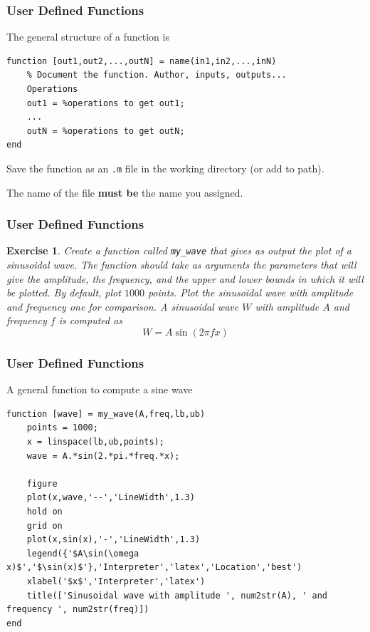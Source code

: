 \documentclass[11pt,xcolor={svgnames},aspectratio=169,usepdftitle=false]{beamer}
\let\toneitemize\itemize
\let\ttwoitemize\enditemize
\renewenvironment{itemize}{\toneitemize\addtolength{\itemsep}{1.35\baselineskip}}{\ttwoitemize}
\newtheorem{exercise}{Exercise}
\begin{document}
\begin{frame}[fragile]
    \frametitle{User Defined Functions}
\begin{itemize}
    \item The general structure of a function is
\begin{lstlisting}
function [out1,out2,...,outN] = name(in1,in2,...,inN)
    % Document the function. Author, inputs, outputs...
    Operations
    out1 = %operations to get out1;
    ...
    outN = %operations to get outN;
end
\end{lstlisting}
    \item Save the function as an \verb;.m; file in the working directory (or add to path).
    \item The name of the file \alert{\textbf{must be}} the name you assigned.
\end{itemize}
\end{frame}

\begin{frame}[fragile]
    \frametitle{User Defined Functions}
\begin{exercise}
Create a function called \verb;my_wave; that gives as output the plot of a sinusoidal wave. The function should take as arguments the parameters that will give the amplitude, the frequency, and the upper and lower bounds in which it will be plotted. By default, plot $1000$ points. Plot the sinusoidal wave with amplitude and frequency one for comparison. A sinusoidal wave $W$ with amplitude $A$ and frequency $f$ is computed as 
\[
W = A \sin(2\pi f x)
\]
\end{exercise}
\end{frame}

\begin{frame}[fragile]
    \frametitle{User Defined Functions}

A general function to compute a sine wave
\begin{lstlisting}
function [wave] = my_wave(A,freq,lb,ub)
    points = 1000;
    x = linspace(lb,ub,points);
    wave = A.*sin(2.*pi.*freq.*x);
    
    figure
    plot(x,wave,'--','LineWidth',1.3)
    hold on
    grid on
    plot(x,sin(x),'-','LineWidth',1.3)
    legend({'$A\sin(\omega x)$','$\sin(x)$'},'Interpreter','latex','Location','best')
    xlabel('$x$','Interpreter','latex')
    title(['Sinusoidal wave with amplitude ', num2str(A), ' and frequency ', num2str(freq)])
end
\end{lstlisting}
\end{frame}
\end{document}
